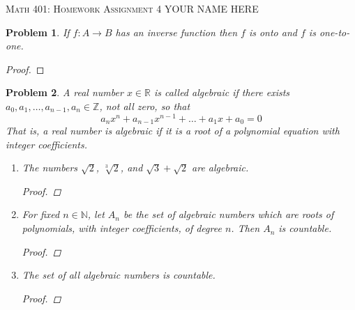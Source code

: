 \documentclass[12pt]{article}
\newtheorem{problem}{Problem}
\newcommand{\NN}{\ensuremath{\mathbb N}}
\newcommand{\RR}{\ensuremath{\mathbb R}}
\newcommand{\ZZ}{\ensuremath{\mathbb Z}}
\begin{document}
\small
\noindent \textsc{Math 401: Homework Assignment 4} \hfill YOUR NAME HERE

\normalsize
\bigskip

\setcounter{problem}{21}


\begin{problem} %
If $f:A\to B$ has an inverse function then $f$ is onto and $f$ is one-to-one.
\end{problem}


\begin{proof}
\end{proof}




\renewcommand{\labelenumi}{(\alph{enumi})}

\begin{problem} %
A real number $x\in\RR$ is called \emph{algebraic} if there exists $a_0, a_1, \dots, a_{n-1}, a_n \in \ZZ$, not all zero, so that
	$$a_n x^n + a_{n-1} x^{n-1} + \dots + a_1 x + a_0 = 0$$
That is, a real number is algebraic if it is a root of a polynomial equation with integer coefficients.

\begin{enumerate}
\item The numbers $\sqrt{2}$, $\sqrt[3]{2}$, and $\sqrt{3} + \sqrt{2}$ are algebraic.

\begin{proof}
\end{proof}

\item For fixed $n\in\NN$, let $A_n$ be the set of algebraic numbers which are roots of polynomials, with integer coefficients, of degree $n$.  Then $A_n$ is countable.

\begin{proof}
\end{proof}

\item The set of all algebraic numbers is countable.

\begin{proof}
\end{proof}
\end{enumerate}
\end{problem}
\end{document}
